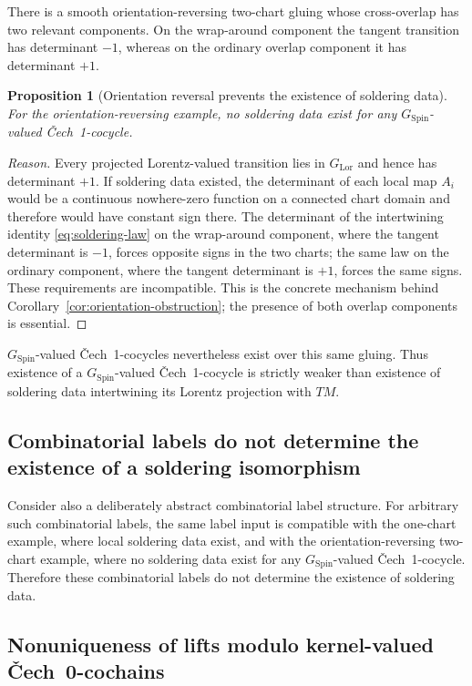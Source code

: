 \documentclass[11pt,a4paper]{article}
\newtheorem{proposition}[theorem]{Proposition}
\theoremstyle{definition}
\theoremstyle{remark}
\newcommand{\SpinG}{G_{\mathrm{Spin}}}
\newcommand{\LorG}{G_{\mathrm{Lor}}}
\newcommand{\Cech}{\ifmmode\text{\v{C}ech}\else\v{C}ech\fi}
\begin{document}
There is a smooth orientation-reversing two-chart gluing whose cross-overlap has two
relevant components.  On the wrap-around component the tangent
transition has determinant \(-1\), whereas on the ordinary overlap component
it has determinant \(+1\).

\begin{proposition}[Orientation reversal prevents the existence of soldering data]
\label{prop:orientation-reversal}
For the orientation-reversing example, no soldering data exist for \emph{any} \(\SpinG\)-valued \Cech\ 1-cocycle.
\end{proposition}

\begin{proof}[Reason]
Every projected Lorentz-valued transition lies in \(\LorG\) and hence has
determinant \(+1\).  If soldering data existed, the determinant of each
local map \(A_i\) would be a continuous nowhere-zero function on a
connected chart domain and therefore would have constant sign there.  The determinant of the intertwining identity \eqref{eq:soldering-law} on the wrap-around component, where the tangent
determinant is \(-1\), forces opposite signs in the two charts; the same law
on the ordinary component, where the tangent determinant is \(+1\), forces
the same signs.  These requirements are incompatible.  This is the concrete
mechanism behind Corollary~\ref{cor:orientation-obstruction}; the
presence of both overlap components is essential.
\end{proof}

\(\SpinG\)-valued \Cech\ 1-cocycles nevertheless exist over this same gluing.
Thus existence of a \(\SpinG\)-valued \Cech\ 1-cocycle is strictly weaker than existence of soldering data intertwining its Lorentz projection with \(TM\).

\subsection{Combinatorial labels do not determine the existence of a soldering isomorphism}

Consider also a deliberately abstract combinatorial label structure.  For arbitrary such combinatorial labels,
the same label input is compatible with the one-chart example, where local
soldering data exist, and with the orientation-reversing two-chart example, where no soldering data exist for any \(\SpinG\)-valued \Cech\ 1-cocycle.  Therefore these combinatorial
labels do not determine the existence of soldering data.  

\subsection{Nonuniqueness of lifts modulo kernel-valued \Cech\ 0-cochains}
\end{document}

